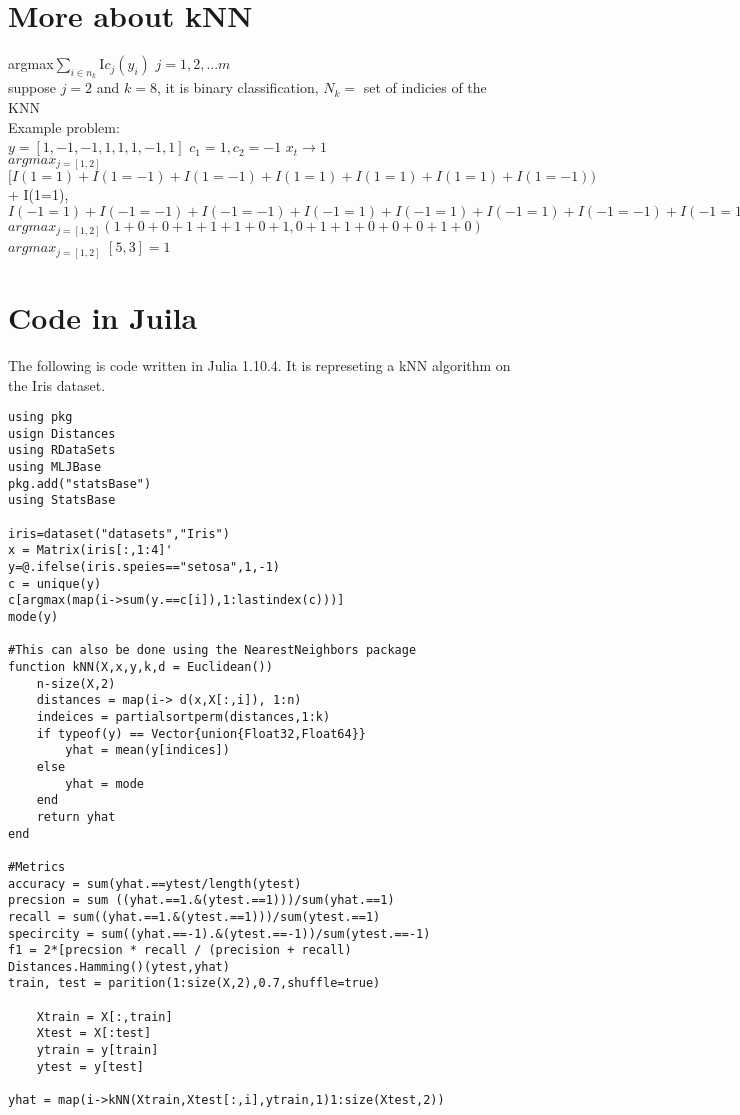 \documentclass[11pt]{exam}
\begin{document}

\section{More about kNN}
argmax$\sum_{i \in n_k}^{}$I$c_j(y_i)$ $j={1,2,...m}$ \\
suppose $j=2$ and $k=8$, it is binary classification, $N_k=$ set of indicies of the KNN \\

Example problem: \\
$y=[1,-1,-1,1,1,1,-1,1]$ $c_1=1,c_2=-1$ $x_t \rightarrow 1$ \\
$argmax_{j=[1,2]}$$[I(1=1)+I(1=-1)+I(1=-1)+I(1=1)+I(1=1)+I(1=1)+I(1=-1))$ \\
 + I(1=1), \\
$I(-1=1)+I(-1=-1)+I(-1=-1)+I(-1=1)+I(-1=1)+I(-1=1)+I(-1=-1)+I(-1=1)$ \\
$argmax_{j=[1,2]} (1+0+0+1+1+1+0+1, 0+1+1+0+0+0+1+0)$\\
$argmax_{j=[1,2]}$ $[5,3]=1$


\section{Code in Juila}
The following is code written in Julia 1.10.4. It is represeting a kNN algorithm on the Iris dataset.

\begin{lstlisting}
using pkg
usign Distances
using RDataSets
using MLJBase
pkg.add("statsBase")
using StatsBase

iris=dataset("datasets","Iris")
x = Matrix(iris[:,1:4]'
y=@.ifelse(iris.speies=="setosa",1,-1)
c = unique(y)
c[argmax(map(i->sum(y.==c[i]),1:lastindex(c)))]
mode(y)

#This can also be done using the NearestNeighbors package
function kNN(X,x,y,k,d = Euclidean())
    n-size(X,2)
    distances = map(i-> d(x,X[:,i]), 1:n)
    indeices = partialsortperm(distances,1:k)
    if typeof(y) == Vector{union{Float32,Float64}}
        yhat = mean(y[indices])
    else
        yhat = mode
    end
    return yhat
end

#Metrics
accuracy = sum(yhat.==ytest/length(ytest)
precsion = sum ((yhat.==1.&(ytest.==1)))/sum(yhat.==1)
recall = sum((yhat.==1.&(ytest.==1)))/sum(ytest.==1)
specircity = sum((yhat.==-1).&(ytest.==-1))/sum(ytest.==-1)
f1 = 2*[precsion * recall / (precision + recall)
Distances.Hamming()(ytest,yhat)
train, test = parition(1:size(X,2),0.7,shuffle=true)

    Xtrain = X[:,train]
    Xtest = X[:test]
    ytrain = y[train]
    ytest = y[test]

yhat = map(i->kNN(Xtrain,Xtest[:,i],ytrain,1)1:size(Xtest,2))

\end{lstlisting}
\end{document}
